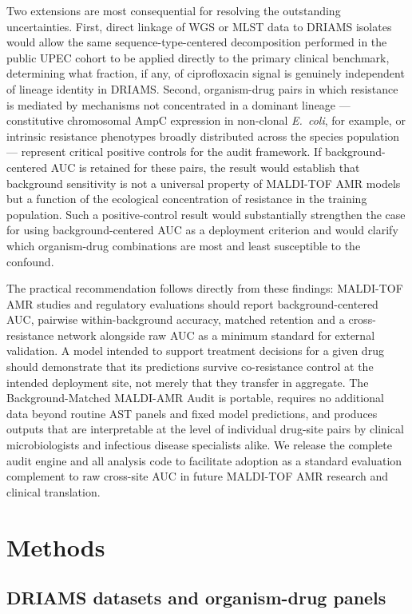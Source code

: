 \documentclass[11pt]{article}
\begin{document}
Two extensions are most consequential for resolving the outstanding uncertainties. First, direct linkage of WGS or MLST data to DRIAMS isolates would allow the same sequence-type-centered decomposition performed in the public UPEC cohort to be applied directly to the primary clinical benchmark, determining what fraction, if any, of ciprofloxacin signal is genuinely independent of lineage identity in DRIAMS. Second, organism-drug pairs in which resistance is mediated by mechanisms not concentrated in a dominant lineage --- constitutive chromosomal AmpC expression in non-clonal \textit{E.~coli}, for example, or intrinsic resistance phenotypes broadly distributed across the species population --- represent critical positive controls for the audit framework. If background-centered AUC is retained for these pairs, the result would establish that background sensitivity is not a universal property of MALDI-TOF AMR models but a function of the ecological concentration of resistance in the training population. Such a positive-control result would substantially strengthen the case for using background-centered AUC as a deployment criterion and would clarify which organism-drug combinations are most and least susceptible to the confound.

The practical recommendation follows directly from these findings: MALDI-TOF AMR studies and regulatory evaluations should report background-centered AUC, pairwise within-background accuracy, matched retention and a cross-resistance network alongside raw AUC as a minimum standard for external validation. A model intended to support treatment decisions for a given drug should demonstrate that its predictions survive co-resistance control at the intended deployment site, not merely that they transfer in aggregate. The Background-Matched MALDI-AMR Audit is portable, requires no additional data beyond routine AST panels and fixed model predictions, and produces outputs that are interpretable at the level of individual drug-site pairs by clinical microbiologists and infectious disease specialists alike. We release the complete audit engine and all analysis code to facilitate adoption as a standard evaluation complement to raw cross-site AUC in future MALDI-TOF AMR research and clinical translation.

\section*{Methods}

\subsection*{DRIAMS datasets and organism-drug panels}
\end{document}
